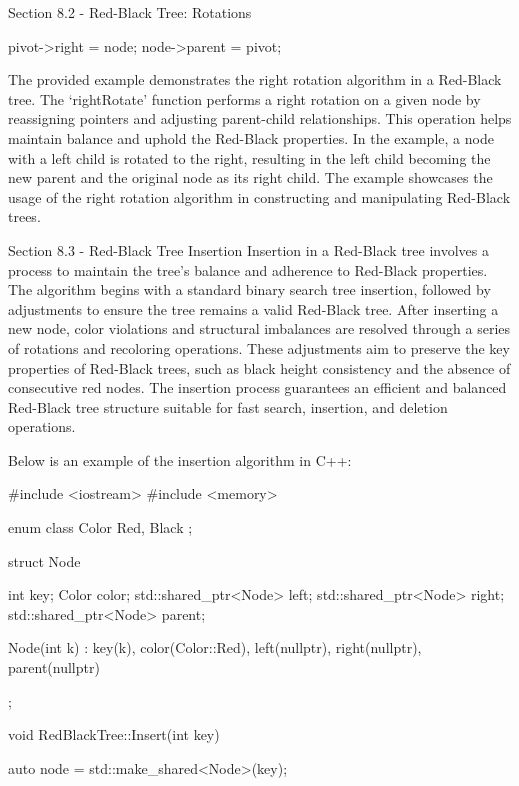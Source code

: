 \begin{notes}{Section 8.2 - Red-Black Tree: Rotations}
\begin{highlight}
\begin{code}[C++]
{        pivot->right = node;
        node->parent = pivot;
    }
    \end{code}
        The provided example demonstrates the right rotation algorithm in a Red-Black tree. The `rightRotate' function performs a right rotation on a given node by reassigning pointers and adjusting parent-child relationships. This operation helps maintain balance and uphold the Red-Black properties. In the example, a node with a left 
        child is rotated to the right, resulting in the left child becoming the new parent and the original node as its right child. The example showcases the usage of the right rotation algorithm in constructing and manipulating Red-Black trees.
    \end{highlight}
\end{notes}

\begin{notes}{Section 8.3 - Red-Black Tree Insertion}
    Insertion in a Red-Black tree involves a process to maintain the tree's balance and adherence to Red-Black properties. The algorithm begins with a standard binary search tree insertion, followed by adjustments to ensure the tree remains a valid Red-Black tree. After inserting a new node, color violations and structural imbalances are resolved 
    through a series of rotations and recoloring operations. These adjustments aim to preserve the key properties of Red-Black trees, such as black height consistency and the absence of consecutive red nodes. The insertion process guarantees an efficient and balanced Red-Black tree structure suitable for fast search, insertion, and deletion operations.
    
    \begin{highlight}
        Below is an example of the insertion algorithm in C++:
    
    \begin{code}[C++]
    #include <iostream>
    #include <memory>
    
    enum class Color { Red, Black };
    
    struct Node {
        int key;
        Color color;
        std::shared_ptr<Node> left;
        std::shared_ptr<Node> right;
        std::shared_ptr<Node> parent;
    
        Node(int k) : key(k), color(Color::Red), left(nullptr), 
        right(nullptr), parent(nullptr) {}
    };
    
    void RedBlackTree::Insert(int key) {
        auto node = std::make_shared<Node>(key);
    
}
\end{code}
\end{highlight}
\end{notes}
